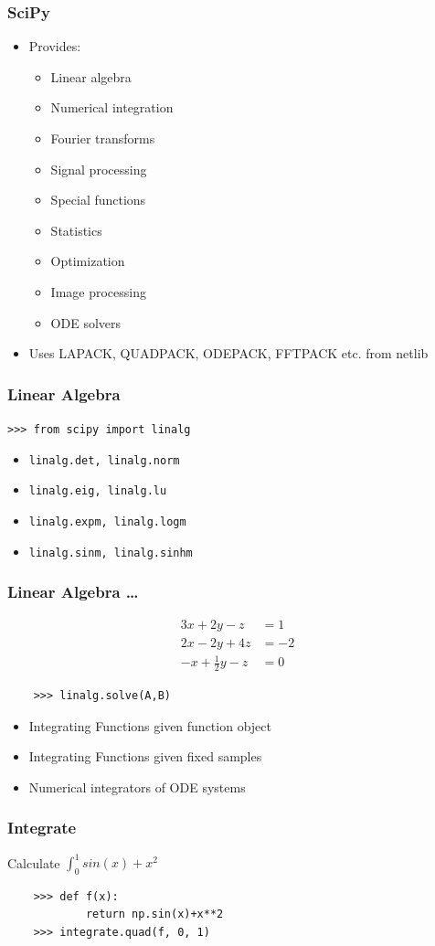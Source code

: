\documentclass[14pt,compress]{beamer}
\newcommand{\typ}[1]{\lstinline{#1}}
\begin{document}
\begin{frame}
  \frametitle{SciPy}
  \begin{itemize}
  \item Provides:
    \begin{itemize}
    \item Linear algebra
    \item Numerical integration
    \item Fourier transforms
    \item Signal processing
    \item Special functions
    \item Statistics
    \item Optimization
    \item Image processing
    \item ODE solvers
    \end{itemize}
  \item Uses LAPACK, QUADPACK, ODEPACK, FFTPACK etc. from netlib
  \end{itemize}
\end{frame}

\begin{frame}[fragile]
  \frametitle{Linear Algebra}
  \typ{>>> from scipy import linalg}
  \begin{itemize}
    \item \typ{linalg.det, linalg.norm}
    \item \typ{linalg.eig, linalg.lu}
    \item \typ{linalg.expm, linalg.logm}
    \item \typ{linalg.sinm, linalg.sinhm}
  \end{itemize}
\end{frame}

\begin{frame}[fragile]
  \frametitle{Linear Algebra \ldots}
  \begin{align*}
    3x + 2y - z  & = 1 \\
    2x - 2y + 4z  & = -2 \\
    -x + \frac{1}{2}y -z & = 0
  \end{align*}
  \begin{lstlisting}
    >>> linalg.solve(A,B)
  \end{lstlisting}
\end{frame}

\begin{frame}[fragile]
  \begin{itemize}
    \item Integrating Functions given function object
    \item Integrating Functions given fixed samples
    \item Numerical integrators of ODE systems
  \end{itemize}
  \frametitle{Integrate}
  Calculate $\int^1_0sin(x) + x^2$
  \begin{lstlisting}
    >>> def f(x):
            return np.sin(x)+x**2
    >>> integrate.quad(f, 0, 1)
  \end{lstlisting}
\end{frame}
\end{document}
